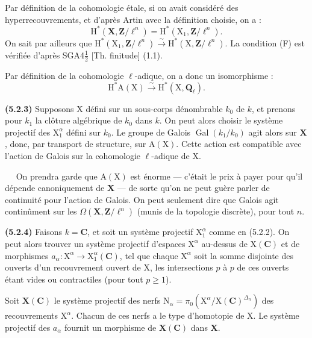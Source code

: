 \documentclass[11pt,leqno]{article}
\newcommand{\Page}[1]{\ifvmode\noindent\else\unskip\ \fi{\footnotesize\textcolor{gray}{[p.\,#1]}}\ \ignorespaces}
\begin{document}
Par définition de la cohomologie étale, si on avait considéré des hyperrecouvrements, et d’après Artin avec la définition choisie, on a :
\[
\mathrm{H}^*(\mathbf{X},\mathbf{Z}/\ell^n)
=\mathrm{H}^*(\mathrm{X}_1,\mathbf{Z}/\ell^n).
\]
On sait par ailleurs que \(\mathrm{H}^*(\mathrm{X}_1,\mathbf{Z}/\ell^n)\xrightarrow{\sim}\mathrm{H}^*(\mathrm{X},\mathbf{Z}/\ell^n)\). La condition (F) est vérifiée d’après SGA4\(\frac{1}{2}\) [Th. finitude] (1.1).

Par définition de la cohomologie \(\ell\)-adique, on a donc un isomorphisme :
\[
\mathrm{H}^*\mathrm{A}(\mathrm{X})
\xrightarrow{\sim}
\mathrm{H}^*(\mathrm{X},\mathbf{Q}_{\ell}).
\]

\textbf{(5.2.3)} Supposons \(\mathrm{X}\) défini sur un sous-corps dénombrable \(k_0\) de \(k\), et prenons pour \(k_1\) la clôture algébrique de \(k_0\) dans \(k\). On peut alors choisir le système projectif des \(\mathrm{X}_1^{\alpha}\) défini sur \(k_0\). Le groupe de Galois \(\operatorname{Gal}(k_1/k_0)\) agit alors sur \(\mathbf{X}\), donc, par transport de structure, sur \(\mathrm{A}(\mathrm{X})\). Cette action est compatible avec l’action de Galois sur la cohomologie \(\ell\)-adique de \(\mathrm{X}\).

\Page{239}
On prendra garde que \(\mathrm{A}(\mathrm{X})\) est énorme — c’était le prix à payer pour qu’il dépende canoniquement de \(\mathbf{X}\) — de sorte qu’on ne peut guère parler de continuité pour l’action de Galois. On peut seulement dire que Galois agit continûment sur les \(\Omega(\mathbf{X},\mathbf{Z}/\ell^n)\) (munis de la topologie discrète), pour tout \(n\).

\textbf{(5.2.4)} Faisons \(k=\mathbf{C}\), et soit un système projectif \(\mathrm{X}_1^{\alpha}\) comme en (5.2.2). On peut alors trouver un système projectif d’espaces \(\mathrm{X}^{\alpha}\) au-dessus de \(\mathrm{X}(\mathbf{C})\) et de morphismes \(a_{\alpha}:\mathrm{X}^{\alpha}\to\mathrm{X}_1^{\alpha}(\mathbf{C})\), tel que chaque \(\mathrm{X}^{\alpha}\) soit la somme disjointe des ouverts d’un recouvrement ouvert de \(\mathrm{X}\), les intersections \(p\) à \(p\) de ces ouverts étant vides ou contractiles (pour tout \(p\geq1\)).

Soit \(\mathbf{X}(\mathbf{C})\) le système projectif des nerfs \(\mathrm{N}_{\alpha}=\pi_0(\mathrm{X}^{\alpha}/\mathrm{X}(\mathbf{C})^{\Delta_n})\) des recouvrements \(\mathrm{X}^{\alpha}\). Chacun de ces nerfs a le type d’homotopie de \(\mathrm{X}\). Le système projectif des \(a_{\alpha}\) fournit un morphisme de \(\mathbf{X}(\mathbf{C})\) dans \(\mathbf{X}\).
\end{document}
